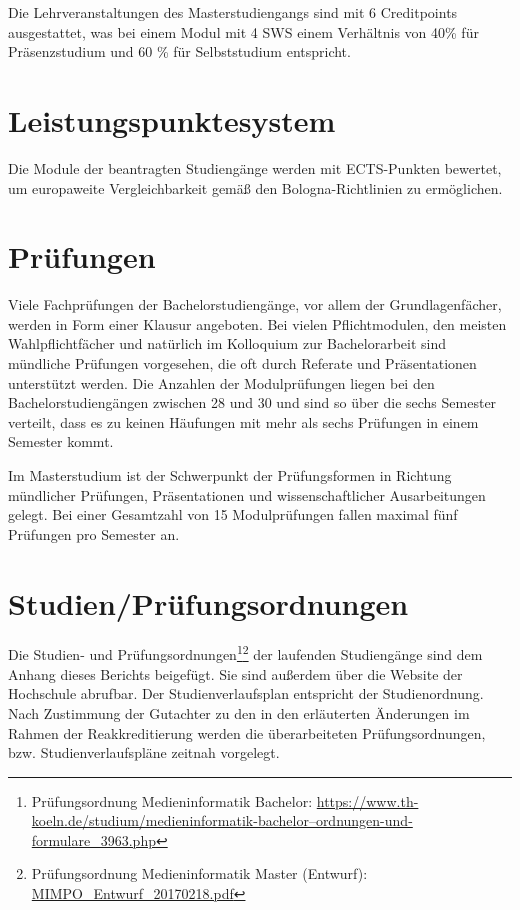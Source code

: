 Die Lehrveranstaltungen des Masterstudiengangs sind mit 6 Creditpoints
ausgestattet, was bei einem Modul mit 4 SWS einem Verhältnis von 40\%
für Präsenzstudium und 60 \% für Selbststudium entspricht.

\section{Leistungspunktesystem}\label{leistungspunktesystem}

Die Module der beantragten Studiengänge werden mit ECTS-Punkten
bewertet, um europaweite Vergleichbarkeit gemäß den Bologna-Richtlinien
zu ermöglichen.

\section{Prüfungen}\label{pruxfcfungen}

Viele Fachprüfungen der Bachelorstudiengänge, vor allem der
Grundlagenfächer, werden in Form einer Klausur angeboten. Bei vielen
Pflichtmodulen, den meisten Wahlpflichtfächer und natürlich im
Kolloquium zur Bachelorarbeit sind mündliche Prüfungen vorgesehen, die
oft durch Referate und Präsentationen unterstützt werden. Die Anzahlen
der Modulprüfungen liegen bei den Bachelorstudiengängen zwischen 28 und
30 und sind so über die sechs Semester verteilt, dass es zu keinen
Häufungen mit mehr als sechs Prüfungen in einem Semester kommt.

Im Masterstudium ist der Schwerpunkt der Prüfungsformen in Richtung
mündlicher Prüfungen, Präsentationen und wissenschaftlicher
Ausarbeitungen gelegt. Bei einer Gesamtzahl von 15 Modulprüfungen fallen
maximal fünf Prüfungen pro Semester an.

\section{Studien/Prüfungsordnungen}\label{studienpruxfcfungsordnungen}

Die Studien- und Prüfungsordnungen\footnote{Prüfungsordnung
  Medieninformatik Bachelor:
  \href{https://www.th-koeln.de/studium/medieninformatik-bachelor--ordnungen-und-formulare_3963.php}{https://www.th-koeln.de/studium/medieninformatik-bachelor--ordnungen-und-formulare\_3963.php}}\footnote{Prüfungsordnung
  Medieninformatik Master (Entwurf):
  \href{https://th-koeln.github.io/mi-2017/anhaenge/MIMPO_Entwurf_20170218.pdf}{MIMPO\_Entwurf\_20170218.pdf}}
der laufenden Studiengänge sind dem Anhang dieses Berichts beigefügt.
Sie sind außerdem über die Website der Hochschule abrufbar. Der
Studienverlaufsplan entspricht der Studienordnung. Nach Zustimmung der
Gutachter zu den in den erläuterten Änderungen im Rahmen der
Reakkreditierung werden die überarbeiteten Prüfungsordnungen, bzw.
Studienverlaufspläne zeitnah vorgelegt.

